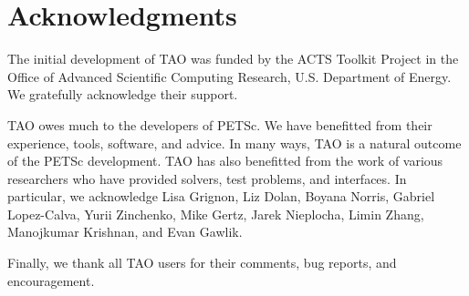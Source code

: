 %
%

\section*{Acknowledgments}

The initial development of TAO was funded by the ACTS Toolkit Project in
the Office of Advanced Scientific Computing Research, U.S. Department
of Energy. We gratefully acknowledge their support.

TAO owes much to the developers of PETSc. We have benefitted
from their experience, tools, software, and advice. In many ways, TAO is a 
natural outcome of the PETSc development.
%
TAO has also benefitted from the work of various researchers
who have provided solvers, test problems, and interfaces.
In particular, we acknowledge Lisa Grignon, Liz Dolan, Boyana Norris, 
Gabriel Lopez-Calva, Yurii Zinchenko, Mike Gertz,
Jarek Nieplocha, Limin Zhang, Manojkumar Krishnan, and Evan Gawlik.

Finally, we thank all TAO users for their comments, bug reports, and
encouragement.

